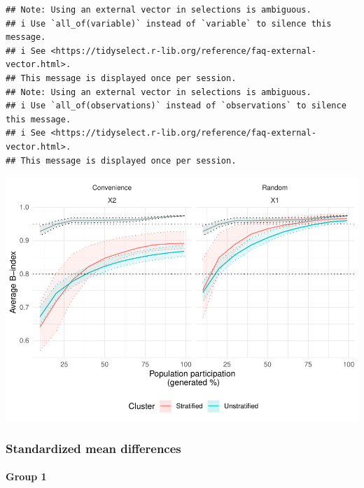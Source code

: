 \documentclass[
  english,
  man,floatsintext]{apa6}
\let\oldparagraph\paragraph
\renewcommand{\paragraph}[1]{\oldparagraph{#1}\mbox{}}
\begin{document}
\begin{verbatim}
## Note: Using an external vector in selections is ambiguous.
## i Use `all_of(variable)` instead of `variable` to silence this message.
## i See <https://tidyselect.r-lib.org/reference/faq-external-vector.html>.
## This message is displayed once per session.
## Note: Using an external vector in selections is ambiguous.
## i Use `all_of(observations)` instead of `observations` to silence this message.
## i See <https://tidyselect.r-lib.org/reference/faq-external-vector.html>.
## This message is displayed once per session.
\end{verbatim}

\includegraphics{5---Analysis_files/figure-latex/unnamed-chunk-16-1.pdf}

\hypertarget{standardized-mean-differences}{%
\subsubsection{Standardized mean differences}\label{standardized-mean-differences}}

\hypertarget{group-1}{%
\paragraph{Group 1}\label{group-1}}
\end{document}
